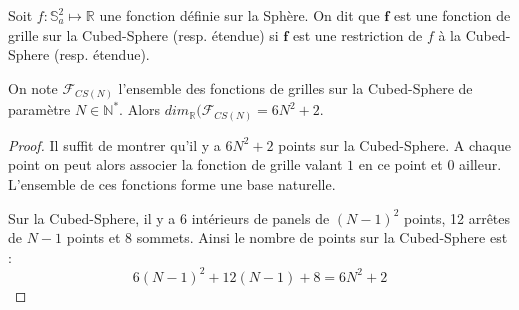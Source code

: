 \begin{definition}
Soit $f : \mathbb{S}_a^2 \mapsto \mathbb{R}$ une fonction définie sur la Sphère. On dit que $\mathbf{f}$ est une fonction de grille sur la Cubed-Sphere (resp. étendue) si $\mathbf{f}$ est une restriction de $f$ à la Cubed-Sphere (resp. étendue). 
\end{definition}

\begin{proposition}
On note $\mathcal{F}_{CS(N)}$ l'ensemble des fonctions de grilles sur la Cubed-Sphere de paramètre $N \in \mathbb{N}^*$. Alors $dim_{\mathbb{R}}(\mathcal{F}_{CS(N)} = 6N^2+2$.
\end{proposition}

\begin{proof}
Il suffit de montrer qu'il y a $6N^2+2$ points sur la Cubed-Sphere. A chaque point on peut alors associer la fonction de grille valant $1$ en ce point et $0$ ailleur. L'ensemble de ces fonctions forme une base naturelle.

Sur la Cubed-Sphere, il y a 6 intérieurs de panels de $(N-1)^2$ points, 12 arrêtes de $N-1$ points et 8 sommets. Ainsi le nombre de points sur la Cubed-Sphere est :
$$
6 (N-1)^2 + 12 (N-1)+8=6N^2+2
$$
\end{proof}




































